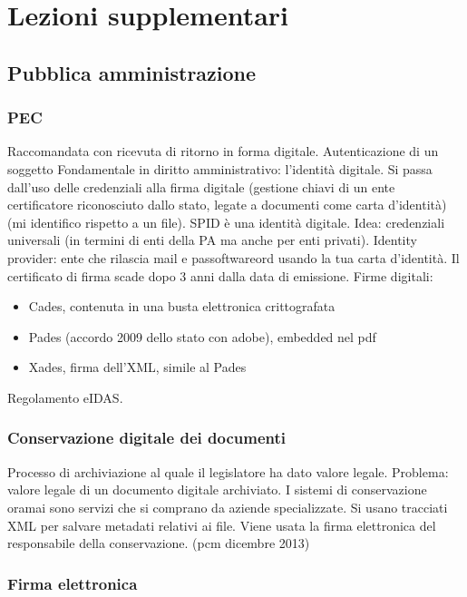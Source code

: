\chapter{Lezioni supplementari}

\section{Pubblica amministrazione}

\subsection{PEC}

Raccomandata con ricevuta di ritorno in forma digitale.
Autenticazione di un soggetto Fondamentale in diritto
amministrativo: l'identit\`a digitale. Si passa dall'uso delle credenziali
alla firma digitale (gestione chiavi di un ente certificatore
riconosciuto dallo stato, legate a documenti come carta d'identit\`a) (mi
identifico rispetto a un file). SPID \`e una identit\`a digitale. Idea:
credenziali universali (in termini di enti della PA ma anche per enti
privati). Identity provider: ente che rilascia mail e passoftwareord usando la
tua carta d'identit\`a. Il certificato di firma scade dopo 3 anni dalla
data di emissione. Firme digitali:

\begin{itemize}
\item
  Cades, contenuta in una busta elettronica crittografata
\item
  Pades (accordo 2009 dello stato con adobe), embedded nel pdf
\item
  Xades, firma dell'XML, simile al Pades
\end{itemize}

Regolamento eIDAS.

\subsection{Conservazione digitale dei
documenti}

Processo di archiviazione al quale il legislatore ha dato valore legale.
Problema: valore legale di un documento digitale archiviato. I sistemi
di conservazione oramai sono servizi che si comprano da aziende
specializzate. Si usano tracciati XML per salvare metadati relativi ai
file. Viene usata la firma elettronica del responsabile della
conservazione. (pcm dicembre 2013)

\subsection{Firma elettronica}

